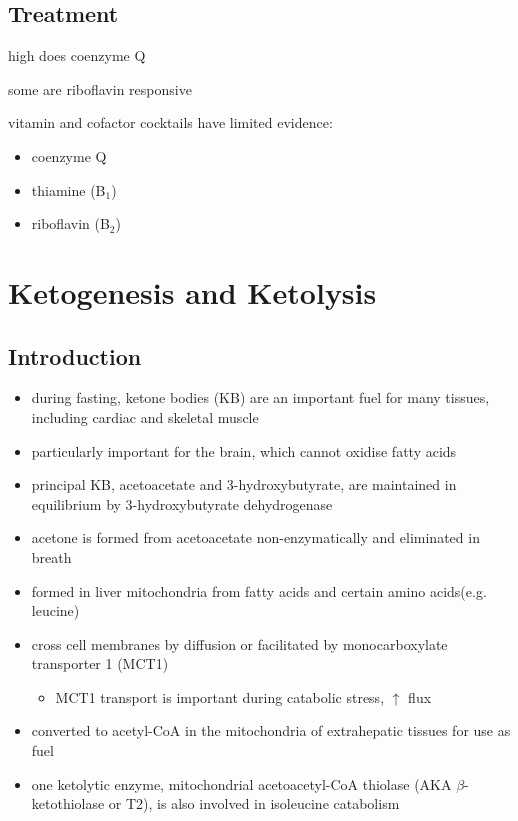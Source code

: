 \documentclass{scrartcl}
\begin{document}
\subsection{Treatment}
\label{sec:org135fc89}
\begin{description}
\item[{Coenzyme Q disorders}] high does coenzyme Q
\item[{CI deficiency}] some are riboflavin responsive
\item vitamin and cofactor cocktails have limited evidence:
\begin{itemize}
\item coenzyme Q
\item thiamine (B\(_{\text{1}}\))
\item riboflavin (B\(_{\text{2}}\))
\end{itemize}
\end{description}
\section{Ketogenesis and Ketolysis}
\label{sec:org6e3ccf5}
\subsection{Introduction}
\label{sec:orgac03792}
\begin{itemize}
\item during fasting, ketone bodies (KB) are an important fuel for many
tissues, including cardiac and skeletal muscle
\item particularly important for the brain, which cannot oxidise fatty acids
\item principal KB, acetoacetate and 3-hydroxybutyrate, are
maintained in equilibrium by 3-hydroxybutyrate dehydrogenase


\item acetone is formed from acetoacetate non-enzymatically and eliminated in breath
\item formed in liver mitochondria from fatty acids and certain amino acids(e.g. leucine)
\item cross cell membranes by diffusion or facilitated by monocarboxylate transporter 1 (MCT1)
\begin{itemize}
\item MCT1 transport is important during catabolic stress, \(\uparrow\) flux
\end{itemize}
\item converted to acetyl-CoA in the mitochondria of extrahepatic tissues for use as fuel
\item one ketolytic enzyme, mitochondrial acetoacetyl-CoA thiolase (AKA
\(\beta\)-ketothiolase or T2), is also involved in isoleucine catabolism
\end{itemize}
\end{document}
